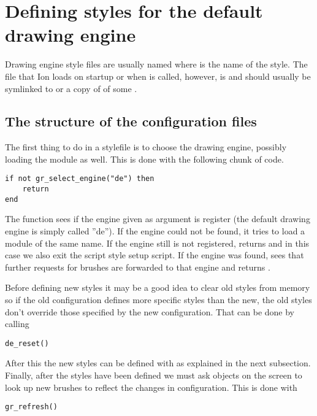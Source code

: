 \section{Defining styles for the default drawing engine}
\label{sec:defaultde}

Drawing engine style files are usually named
 where  is the name of the
style. The file that Ion loads on startup or when
 is called, however, is 
and should usually be symlinked to or a copy of of some
.

\subsection{The structure of the configuration files}

The first thing to do in a stylefile is to choose the drawing
engine, possibly loading the module as well. This is done
with the following chunk of code.

\begin{verbatim}
if not gr_select_engine("de") then 
    return 
end
\end{verbatim}

The  function sees if the engine
given as argument is register (the default drawing engine is
simply called ''de''). If the engine could not be found, it
tries to load a module of the same name. If the engine still
is not registered,  returns 
and in this case we also exit the script style setup script.
If the engine was found,  sees that
further requests for brushes are forwarded to that engine
and returns .

Before defining new styles it may be a good idea to clear old
styles from memory so if the old configuration defines more
specific styles than the new, the old styles don't override 
those specified by the new configuration. That can be done by
calling

\begin{verbatim}
de_reset()
\end{verbatim}

After this the new styles can be defined with 
as explained in the next subsection. Finally, after the styles have
been defined we must ask objects on the screen to look up new brushes
to reflect the changes in configuration. This is done with

\begin{verbatim}
gr_refresh()
\end{verbatim}

